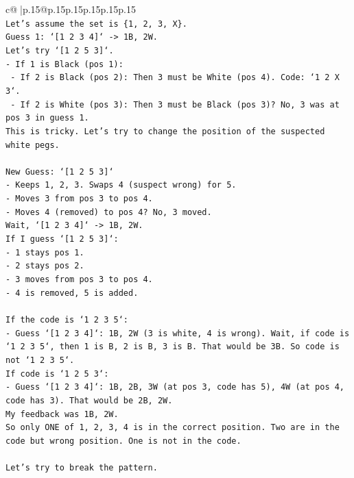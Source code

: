 \documentclass{article}
\begin{document}
{\begin{supertabular}{c@{$\;$}|p{.15\linewidth}@{}p{.15\linewidth}p{.15\linewidth}p{.15\linewidth}p{.15\linewidth}p{.15\linewidth}}
{{{\\ 
\texttt{Let's assume the set is \{1, 2, 3, X\}.} \\
\texttt{Guess 1: `{[}1 2 3 4{]}` {-}> 1B, 2W.} \\
\texttt{Let's try `{[}1 2 5 3{]}`.} \\
\texttt{{-} If 1 is Black (pos 1):} \\
\texttt{  {-} If 2 is Black (pos 2): Then 3 must be White (pos 4). Code: `1 2 X 3`.} \\
\texttt{  {-} If 2 is White (pos 3): Then 3 must be Black (pos 3)? No, 3 was at pos 3 in guess 1.} \\
\texttt{This is tricky. Let's try to change the position of the suspected white pegs.} \\
\\ 
\texttt{New Guess: `{[}1 2 5 3{]}`} \\
\texttt{{-} Keeps 1, 2, 3. Swaps 4 (suspect wrong) for 5.} \\
\texttt{{-} Moves 3 from pos 3 to pos 4.} \\
\texttt{{-} Moves 4 (removed) to pos 4? No, 3 moved.} \\
\texttt{Wait, `{[}1 2 3 4{]}` {-}> 1B, 2W.} \\
\texttt{If I guess `{[}1 2 5 3{]}`:} \\
\texttt{{-} 1 stays pos 1.} \\
\texttt{{-} 2 stays pos 2.} \\
\texttt{{-} 3 moves from pos 3 to pos 4.} \\
\texttt{{-} 4 is removed, 5 is added.} \\
\\ 
\texttt{If the code is `1 2 3 5`:} \\
\texttt{{-} Guess `{[}1 2 3 4{]}`: 1B, 2W (3 is white, 4 is wrong). Wait, if code is `1 2 3 5`, then 1 is B, 2 is B, 3 is B. That would be 3B. So code is not `1 2 3 5`.} \\
\texttt{If code is `1 2 5 3`:} \\
\texttt{{-} Guess `{[}1 2 3 4{]}`: 1B, 2B, 3W (at pos 3, code has 5), 4W (at pos 4, code has 3). That would be 2B, 2W.} \\
\texttt{My feedback was 1B, 2W.} \\
\texttt{So only ONE of 1, 2, 3, 4 is in the correct position. Two are in the code but wrong position. One is not in the code.} \\
\\ 
\texttt{Let's try to break the pattern.} \\
}}}
\end{supertabular}}
\end{document}
